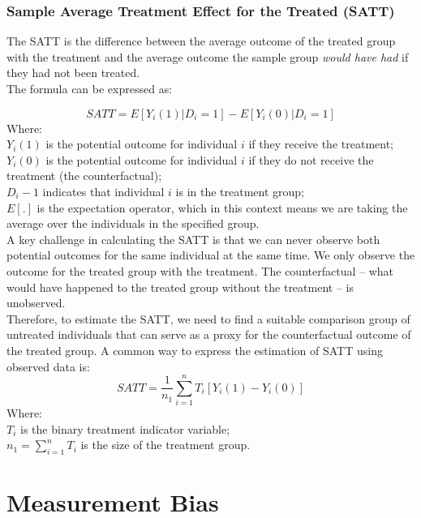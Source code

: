 \documentclass{article}
\begin{document}
    \subsubsection{Sample Average Treatment Effect for the Treated (SATT)}

    \noindent The SATT is the difference between the average outcome of the
treated group with the treatment and the average outcome the sample group \textit{would have had} if they had not been treated.\\

    \noindent The formula can be expressed as:

    \[
        SATT = E[Y_{i}(1)|D_{i}=1] - E[Y_{i}(0)|D_{i}=1]
    \]
    \indent Where:\\
    \indent $Y_i(1)$ is the potential outcome for individual $i$ if
they receive the treatment;\\
    \indent $Y_i(0)$ is the potential outcome for individual $i$ if
they do not receive the treatment (the counterfactual);\\
    \indent $D_i-1$ indicates that individual $i$ is in the treatment group;\\
    \indent $E[.]$ is the expectation operator, which in this context means
we are taking the average over the individuals in the specified group.\\

    \noindent A key challenge in calculating the SATT is that we can never
observe both potential outcomes for the same individual at the same time. We
only observe the outcome for the treated group with the treatment. The
counterfactual -- what would have happened to the treated group without the
treatment -- is unobserved.\\

    \noindent Therefore, to estimate the SATT, we need to find a suitable
comparison group of untreated individuals that can serve as a proxy for
the counterfactual outcome of the treated group. A common way to express
the estimation of SATT using observed data is:\\

    \[
        SATT = \frac{1}{n_1} \sum^n_{i=1}T_i[Y_i(1)-Y_i(0)]
    \]
    \indent Where:\\
    \indent $T_i$ is the binary treatment indicator variable;\\
    \indent $n_1 = \sum^n_{i=1}T_i$ is the size of the treatment group.\\

\section{Measurement Bias}
\end{document}
